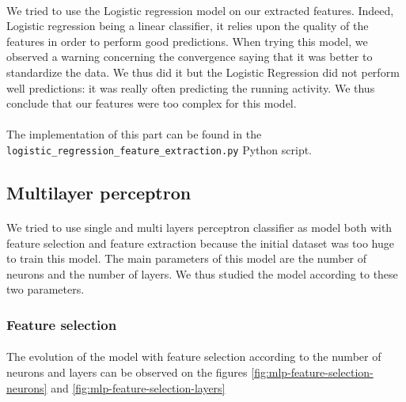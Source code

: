 \documentclass[a4paper, 11pt, oneside]{article}
\begin{document}
\paragraph{}We tried to use the Logistic regression model on our extracted features. Indeed, Logistic regression being a linear classifier, it relies upon the quality of the features in order to perform good predictions.
When trying this model, we observed a warning concerning the convergence saying that it was better to standardize the data. We thus did it but the Logistic Regression did not perform well predictions: it was really often predicting the running activity. 
We thus conclude that our features were too complex for this model. 

\paragraph{}The implementation of this part can be found in the \texttt{logistic\_regression\_feature\_extraction.py} Python script.

\subsection{Multilayer perceptron} \label{subsec:mlp}
\paragraph{}We tried to use single and multi layers perceptron classifier as model both with feature selection and feature extraction because the initial dataset was too huge to train this model. The main parameters of this model
are the number of neurons and the number of layers. We thus studied the model according to these two parameters.

\subsubsection{Feature selection}

\paragraph{}The evolution of the model with feature selection according to the number of neurons and layers can be observed on the figures \ref{fig:mlp-feature-selection-neurons} and \ref{fig:mlp-feature-selection-layers}
\end{document}

